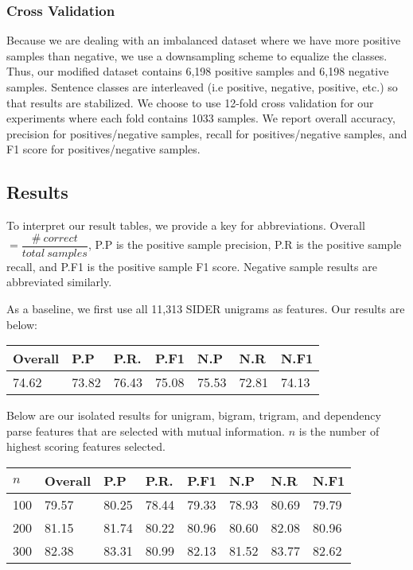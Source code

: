 \documentclass{acm_proc_article-sp}
\begin{document}
\subsubsection{Cross Validation}
Because we are dealing with an imbalanced dataset where we have more positive samples than negative, we use a downsampling scheme to equalize the classes. Thus, our modified dataset contains 6,198 positive samples and 6,198 negative samples. Sentence classes are interleaved (i.e positive, negative, positive, etc.) so that results are stabilized. We choose to use 12-fold cross validation for our experiments where each fold contains 1033 samples.
We report overall accuracy, precision for positives/negative samples, recall for positives/negative samples, and F1 score for positives/negative samples. 

\subsection{Results}
To interpret our result tables, we provide a key for abbreviations. Overall $= \dfrac{\#\:correct}{total\:samples}$, P.P is the positive sample precision, P.R is the positive sample recall, and P.F1 is the positive sample F1 score. Negative sample results are abbreviated similarly. 

As a baseline, we first use all 11,313 SIDER unigrams as features. Our results are below:

\vspace{-3mm}
\begin{tabular}{| l | l | l | l | l | l | l |}
\hline
Overall & P.P & P.R. & P.F1 & N.P & N.R & N.F1 \\ \hline
74.62 & 73.82 & 76.43 & 75.08 & 75.53 & 72.81 & 74.13 \\ \hline
\end{tabular} 

Below are our isolated results for unigram, bigram, trigram, and dependency parse features that are selected with mutual information. $n$ is the number of highest scoring features selected. 
\vspace{-3mm}
\begin{tabular}{| l | l | l | l | l | l | l | l |}
\hline
$n$ & Overall & P.P & P.R. & P.F1 & N.P & N.R & N.F1 \\ \hline
100 & 79.57 & 80.25 & 78.44 & 79.33 & 78.93 & 80.69 & 79.79 \\ \hline
200 & 81.15 & 81.74 & 80.22 & 80.96 & 80.60 & 82.08 & 80.96 \\ \hline
300 & 82.38 & 83.31 & 80.99 & 82.13 & 81.52 & 83.77 & 82.62 \\ \hline
\end{tabular} 
\end{document}
